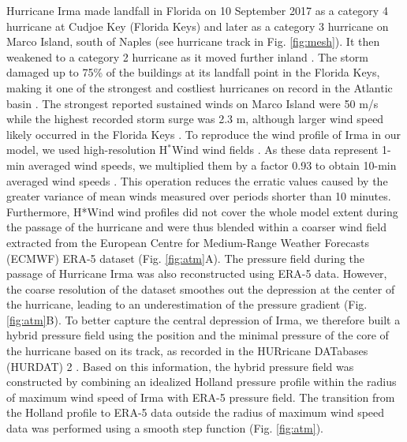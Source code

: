 Hurricane Irma made landfall in Florida on 10 September 2017 as a category 4 hurricane at Cudjoe Key (Florida Keys) and later as a category 3 hurricane on Marco Island, south of Naples (see hurricane track in Fig. \ref{fig:mesh}). It then weakened to a category 2 hurricane as it moved further inland \citep{irmaNOAA}. The storm damaged up to 75\% of the buildings at its landfall point in the Florida Keys, making it one of the strongest and costliest hurricanes on record in the Atlantic basin \citep{xian2018brief,zhang2019modeling}. The strongest reported sustained winds on Marco Island were 50 m/s while the highest recorded storm surge was 2.3 m, although larger wind speed likely occurred in the Florida Keys \citep{pinelli2018overview}. To reproduce the wind profile of Irma in our model, we used high-resolution H$^\ast$Wind wind fields \citep{powell1998hrd}. As these data represent 1-min averaged wind speeds, we multiplied them by a factor 0.93 to obtain 10-min averaged wind speeds \citep{harper2010guidelines}. This operation reduces the erratic values caused by the greater variance of mean winds measured over periods shorter than 10 minutes. Furthermore, H*Wind wind profiles did not cover the whole model extent during the passage of the hurricane and were thus blended within a coarser wind field extracted from the European Centre for Medium-Range Weather Forecasts (ECMWF) ERA-5 dataset (Fig. \ref{fig:atm}A). The pressure field during the passage of Hurricane Irma was also reconstructed using ERA-5 data. However, the coarse resolution of the dataset smoothes out the depression at the center of the hurricane, leading to an underestimation of the pressure gradient (Fig. \ref{fig:atm}B). To better capture the central depression of Irma, we therefore built a hybrid pressure field using the position and the minimal pressure of the core of the hurricane based on its track, as recorded in the HURricane DATabases (HURDAT) 2 \citep{landsea2013atlantic}. Based on this information, the hybrid pressure field was constructed by combining an idealized Holland pressure profile \citep{lin2012hurricane} within the radius of maximum wind speed of Irma \citep{knaff2018statistical} with ERA-5 pressure field. The transition from the Holland profile to ERA-5 data outside the radius of maximum wind speed data was performed using a smooth step function (Fig. \ref{fig:atm}).

